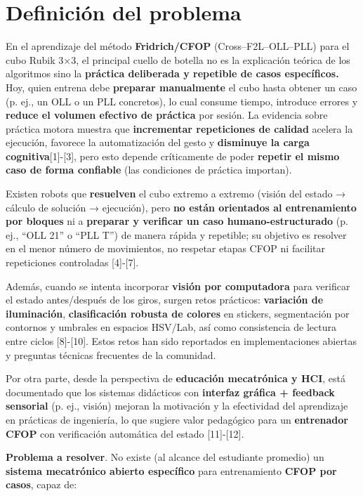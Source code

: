 \section{Definición del problema}


En el aprendizaje del método \textbf{Fridrich/CFOP} (Cross–F2L–OLL–PLL) para el cubo Rubik 3×3, el principal cuello de botella no es la explicación teórica de los algoritmos sino la \textbf{práctica deliberada y repetible de casos específicos.} Hoy, quien entrena debe \textbf{preparar manualmente} el cubo hasta obtener un caso (p. ej., un OLL o un PLL concretos), lo cual consume tiempo, introduce errores y \textbf{reduce el volumen efectivo de práctica} por sesión. La evidencia sobre práctica motora muestra que \textbf{incrementar repeticiones de calidad} acelera la ejecución, favorece la automatización del gesto y \textbf{disminuye la carga cognitiva}[1]-[3], pero esto depende críticamente de poder \textbf{repetir el mismo caso de forma confiable} (las condiciones de práctica importan).

Existen robots que \textbf{resuelven} el cubo extremo a extremo (visión del estado → cálculo de solución → ejecución), pero \textbf{no están orientados al entrenamiento por bloques} ni a \textbf{preparar y verificar un caso humano-estructurado} (p. ej., “OLL 21” o “PLL T”) de manera rápida y repetible; su objetivo es resolver en el menor número de movimientos, no respetar etapas CFOP ni facilitar repeticiones controladas [4]-[7].

Además, cuando se intenta incorporar \textbf{visión por computadora} para verificar el estado antes/después de los giros, surgen retos prácticos: \textbf{variación de iluminación}, \textbf{clasificación robusta de colores} en stickers, segmentación por contornos y umbrales en espacios HSV/Lab, así como consistencia de lectura entre ciclos [8]-[10]. Estos retos han sido reportados en implementaciones abiertas y preguntas técnicas frecuentes de la comunidad.

Por otra parte, desde la perspectiva de \textbf{educación mecatrónica y HCI}, está documentado que los sistemas didácticos con \textbf{interfaz gráfica + feedback sensorial} (p. ej., visión) mejoran la motivación y la efectividad del aprendizaje en prácticas de ingeniería, lo que sugiere valor pedagógico para un \textbf{entrenador CFOP} con verificación automática del estado [11]-[12].

\textbf{Problema a resolver}. No existe (al alcance del estudiante promedio) un \textbf{sistema mecatrónico abierto específico} para entrenamiento \textbf{CFOP por casos}, capaz de:


